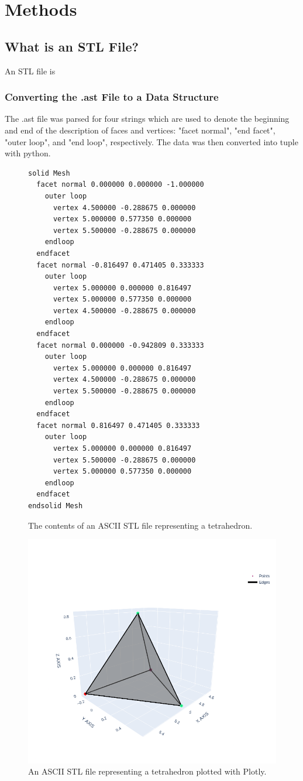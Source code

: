 \documentclass[ma]{uncgdissertationexp2}
\theoremstyle{plain}
\theoremstyle{definition}
\theoremstyle{remark}
\begin{document}
\chapter{Methods}

\section{What is an STL File?}
An STL file is 

\subsection{Converting the .ast File to a Data Structure}

The .ast file was parsed for four strings which are used to denote the beginning and end of the description of faces and vertices: "facet normal", "end facet", "outer loop", and "end loop", respectively. The data was then converted into tuple with python.

\begin{figure}[H]
\centering
\begin{lstlisting}
solid Mesh
  facet normal 0.000000 0.000000 -1.000000
    outer loop
      vertex 4.500000 -0.288675 0.000000
      vertex 5.000000 0.577350 0.000000
      vertex 5.500000 -0.288675 0.000000
    endloop
  endfacet
  facet normal -0.816497 0.471405 0.333333
    outer loop
      vertex 5.000000 0.000000 0.816497
      vertex 5.000000 0.577350 0.000000
      vertex 4.500000 -0.288675 0.000000
    endloop
  endfacet
  facet normal 0.000000 -0.942809 0.333333
    outer loop
      vertex 5.000000 0.000000 0.816497
      vertex 4.500000 -0.288675 0.000000
      vertex 5.500000 -0.288675 0.000000
    endloop
  endfacet
  facet normal 0.816497 0.471405 0.333333
    outer loop
      vertex 5.000000 0.000000 0.816497
      vertex 5.500000 -0.288675 0.000000
      vertex 5.000000 0.577350 0.000000
    endloop
  endfacet
endsolid Mesh
\end{lstlisting}
\caption{The contents of an ASCII STL file representing a tetrahedron.}
\end{figure}
\newpage
\begin{figure}[H]
    \centering
    \includegraphics[width=0.5\linewidth]{tetrahedron_ast_plot.png}
    \caption{An ASCII STL file representing a tetrahedron plotted with Plotly.}
    \label{fig:ast_code}
\end{figure}
\end{document}

